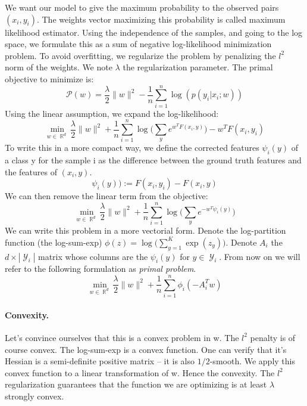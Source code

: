 \documentclass{article}
\DeclareMathOperator{\R}{\mathbb{R}}
\DeclareMathOperator{\1}{\mathbb{1}}
\DeclareMathOperator{\Y}{\mathcal{Y}}
\begin{document}
We want our model to give the maximum probability to the observed pairs $(x_i, y_i)$.
The weights vector maximizing this probability is called maximum likelihood estimator.
Using the independence of the samples, and going to the log space, we formulate this as a sum of negative log-likelihood minimization problem.
To avoid overfitting, we regularize the problem by penalizing the $l^2$ norm of the weights.
We note $\lambda$ the regularization parameter. The primal objective to minimize is:
\begin{equation*}
\mathscr P(w) = \frac{\lambda}{2}\|w\|^2 - \frac{1}{n}   \sum_{i=1}^{n} \log(p(y_i|x_i; w))	
\end{equation*}
Using the linear assumption, we expand the log-likelihood:
\begin{equation*}
	\min_{w\in\R^d} \frac{\lambda}{2}\|w\|^2 + \frac{1}{n}   \sum_{i=1}^{n}  \log \big (\sum_y e^{w^TF(x_i, y)} \big ) - w^TF(x_i, y_i)	
\end{equation*}
To write this in a more compact way, we define the corrected features $\psi_i(y)$ of a class y for the sample i as the difference between the ground truth features and the features of $(x_i, y)$.
\begin{equation*}
	\psi_i(y)) := F(x_i, y_i) - F(x_i, y)
\end{equation*}
We can then remove the linear term from the objective:
\begin{equation*}
	\min_{w\in\R^d} \frac{\lambda}{2}\|w\|^2 + \frac{1}{n}   \sum_{i=1}^{n}  \log \big (\sum_y e^{- w^T\psi_i(y)} \big )
\end{equation*}
We can write this problem in a more vectorial form.
Denote the log-partition function (the log-sum-exp) $\phi(z) = \log \big(\sum_{y=1}^K \exp(z_y)\big)$. 
Denote $A_i$ the $d \times |\Y_i|$ matrix whose columns are the $\psi_i(y)$ for $y \in \Y_i$.
From now on we will refer to the following formulation as \textit{primal problem}.
\begin{equation}
	\label{primal problem}
	\min_{w\in\R^d}  \frac{\lambda}{2}\|w\|^2 + \frac{1}{n}   \sum_{i=1}^{n} \phi_i(-A_i^Tw)
\end{equation} 

\paragraph{Convexity.}
Let's convince ourselves that this is a convex problem in w.
The $l^2$ penalty is of course convex.
The log-sum-exp is a convex function.
One can verify that it's Hessian is a semi-definite positive matrix -- it is also $1/2$-smooth.
We apply this convex function to a linear transformation of w.
Hence the convexity.
The $l^2$ regularization guarantees that the function we are optimizing is at least $\lambda$ strongly convex. 
\end{document}
